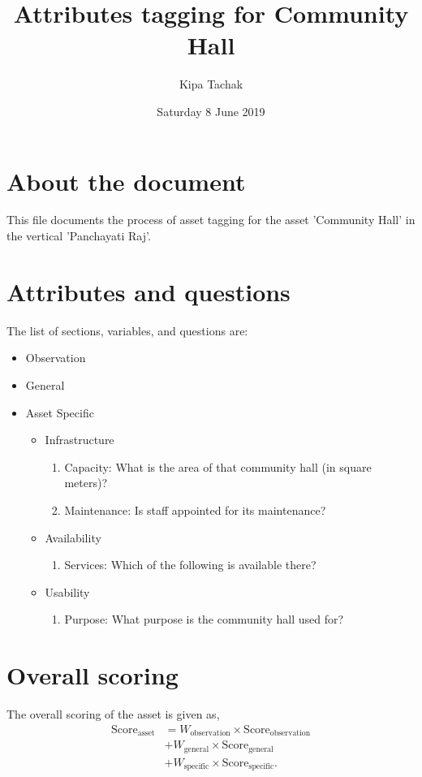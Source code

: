 \documentclass[oneside,twocolumn]{article}
\title{Attributes tagging for Community Hall}
\author{Kipa Tachak}
\date{Saturday  8 June 2019}
\newcommand{\tsub}[2]{\text{#1}_{\text{#2}}}
\newcommand{\tsubb}[2]{#1_{\text{#2}}}
\begin{document}
\maketitle

\section{About the document}
This file documents the process of asset tagging for the asset 'Community Hall' in the vertical 'Panchayati Raj'.

\section{Attributes and questions}
The list of sections, variables, and questions are:
\begin{itemize}
	\item Observation
	\item General
	\item Asset Specific
		\begin{itemize}
			\item Infrastructure
				\begin{enumerate}
					\item Capacity: What is the area of that community hall (in square meters)?
					\item Maintenance: Is staff appointed for its maintenance?
				\end{enumerate}
			\item Availability
				\begin{enumerate}
					\item Services: Which of the following is available there?
				\end{enumerate}
			\item Usability
				\begin{enumerate}
					\item Purpose: What purpose is the community hall used for?
				\end{enumerate}
		\end{itemize}
\end{itemize}

\section{Overall scoring}
The overall scoring of the asset is given as,
\begin{align*}
	\tsub{Score}{asset} &= \tsubb{W}{observation} \times \tsub{Score}{observation} \\
	&+ \tsubb{W}{general} \times \tsub{Score}{general} \\
	&+ \tsubb{W}{specific} \times \tsub{Score}{specific}.
\end{align*}
\end{document}
